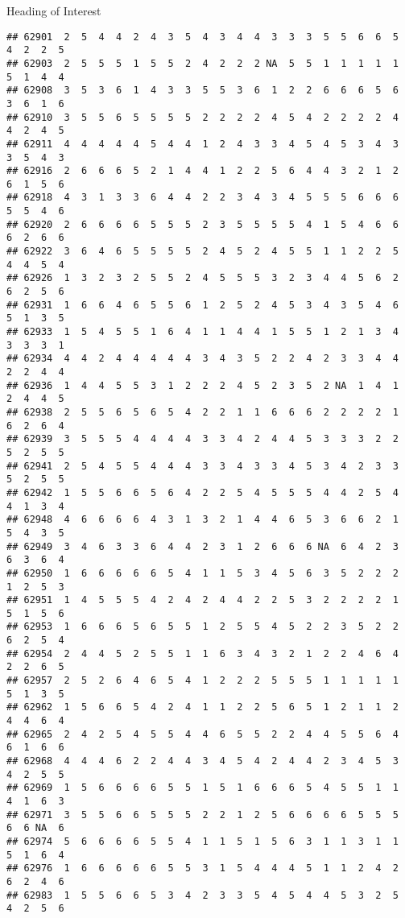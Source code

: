 \documentclass[
  ignorenonframetext,
]{beamer}
\begin{document}
\begin{frame}[fragile]{Heading of Interest}
\begin{verbatim}
## 62901  2  5  4  4  2  4  3  5  4  3  4  4  3  3  3  5  5  6  6  5  4  2  2  5
## 62903  2  5  5  5  1  5  5  2  4  2  2  2 NA  5  5  1  1  1  1  1  5  1  4  4
## 62908  3  5  3  6  1  4  3  3  5  5  3  6  1  2  2  6  6  6  5  6  3  6  1  6
## 62910  3  5  5  6  5  5  5  5  2  2  2  2  4  5  4  2  2  2  2  4  4  2  4  5
## 62911  4  4  4  4  4  5  4  4  1  2  4  3  3  4  5  4  5  3  4  3  3  5  4  3
## 62916  2  6  6  6  5  2  1  4  4  1  2  2  5  6  4  4  3  2  1  2  6  1  5  6
## 62918  4  3  1  3  3  6  4  4  2  2  3  4  3  4  5  5  5  6  6  6  5  5  4  6
## 62920  2  6  6  6  6  5  5  5  2  3  5  5  5  5  4  1  5  4  6  6  6  2  6  6
## 62922  3  6  4  6  5  5  5  5  2  4  5  2  4  5  5  1  1  2  2  5  4  4  5  4
## 62926  1  3  2  3  2  5  5  2  4  5  5  5  3  2  3  4  4  5  6  2  6  2  5  6
## 62931  1  6  6  4  6  5  5  6  1  2  5  2  4  5  3  4  3  5  4  6  5  1  3  5
## 62933  1  5  4  5  5  1  6  4  1  1  4  4  1  5  5  1  2  1  3  4  3  3  3  1
## 62934  4  4  2  4  4  4  4  4  3  4  3  5  2  2  4  2  3  3  4  4  2  2  4  4
## 62936  1  4  4  5  5  3  1  2  2  2  4  5  2  3  5  2 NA  1  4  1  2  4  4  5
## 62938  2  5  5  6  5  6  5  4  2  2  1  1  6  6  6  2  2  2  2  1  6  2  6  4
## 62939  3  5  5  5  4  4  4  4  3  3  4  2  4  4  5  3  3  3  2  2  5  2  5  5
## 62941  2  5  4  5  5  4  4  4  3  3  4  3  3  4  5  3  4  2  3  3  5  2  5  5
## 62942  1  5  5  6  6  5  6  4  2  2  5  4  5  5  5  4  4  2  5  4  4  1  3  4
## 62948  4  6  6  6  6  4  3  1  3  2  1  4  4  6  5  3  6  6  2  1  5  4  3  5
## 62949  3  4  6  3  3  6  4  4  2  3  1  2  6  6  6 NA  6  4  2  3  6  3  6  4
## 62950  1  6  6  6  6  6  5  4  1  1  5  3  4  5  6  3  5  2  2  2  1  2  5  3
## 62951  1  4  5  5  5  4  2  4  2  4  4  2  2  5  3  2  2  2  2  1  5  1  5  6
## 62953  1  6  6  6  5  6  5  5  1  2  5  5  4  5  2  2  3  5  2  2  6  2  5  4
## 62954  2  4  4  5  2  5  5  1  1  6  3  4  3  2  1  2  2  4  6  4  2  2  6  5
## 62957  2  5  2  6  4  6  5  4  1  2  2  2  5  5  5  1  1  1  1  1  5  1  3  5
## 62962  1  5  6  6  5  4  2  4  1  1  2  2  5  6  5  1  2  1  1  2  4  4  6  4
## 62965  2  4  2  5  4  5  5  4  4  6  5  5  2  2  4  4  5  5  6  4  6  1  6  6
## 62968  4  4  4  6  2  2  4  4  3  4  5  4  2  4  4  2  3  4  5  3  4  2  5  5
## 62969  1  5  6  6  6  6  5  5  1  5  1  6  6  6  5  4  5  5  1  1  4  1  6  3
## 62971  3  5  5  6  6  5  5  5  2  2  1  2  5  6  6  6  6  5  5  5  6  6 NA  6
## 62974  5  6  6  6  6  5  5  4  1  1  5  1  5  6  3  1  1  3  1  1  5  1  6  4
## 62976  1  6  6  6  6  6  5  5  3  1  5  4  4  4  5  1  1  2  4  2  6  2  4  6
## 62983  1  5  5  6  6  5  3  4  2  3  3  5  4  5  4  4  5  3  2  5  4  2  5  6

\end{verbatim}
\end{frame}
\end{document}
